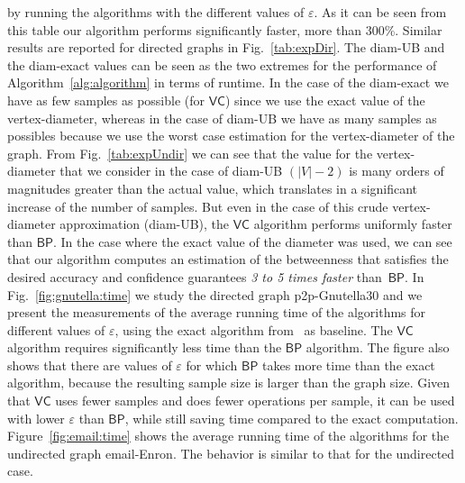 by running the algorithms with the different values of $\varepsilon$. As it can
be seen from this table our algorithm performs significantly faster, more than
300\%. Similar results are reported for directed graphs in Fig.~\ref{tab:expDir}.
The diam-UB
and the diam-exact values can be seen as the two extremes for the performance of 
Algorithm~\ref{alg:algorithm} in terms of runtime. In the case of the diam-exact
we have as few samples as possible (for $\mathsf{VC}$) since we use the exact
value of the vertex-diameter, whereas in the case of diam-UB we have as many
samples as possibles because we use the worst case estimation for the
vertex-diameter of the graph.  %
From Fig.~\ref{tab:expUndir} we can see that the value for the
vertex-diameter that we consider in the case of diam-UB $(|V|-2)$ is many orders of
magnitudes greater than the actual value, which translates in a significant
increase of the number of samples. But even in the case of this crude
vertex-diameter approximation (diam-UB), the $\mathsf{VC}$ algorithm performs uniformly faster than
$\mathsf{BP}$. In the case where the exact value of the diameter was used, we
can see that our algorithm computes an estimation of the betweenness that
satisfies the desired accuracy and confidence guarantees \emph{3 to 5 times
faster} than~$\mathsf{BP}$. 
 In Fig.~\ref{fig:gnutella:time} we study
the directed graph p2p-Gnutella30 and we present the measurements of
the average running time of the algorithms for different values of
$\varepsilon$, using the exact algorithm from~\citep{Brandes01} as baseline. The
$\mathsf{VC}$ algorithm requires significantly less time than the $\mathsf{BP}$
algorithm. The figure also shows that there are values of $\varepsilon$ for
which $\mathsf{BP}$ takes more time than the exact algorithm, because the
resulting sample size is larger than the graph size. Given that $\mathsf{VC}$
uses fewer samples and does fewer operations per sample, it can be used with
lower $\varepsilon$ than $\mathsf{BP}$, while still saving time compared to the
exact computation. Figure~\ref{fig:email:time} shows the average running time of the
algorithms for the undirected graph email-Enron. The behavior is  similar to
that for the undirected case. %
